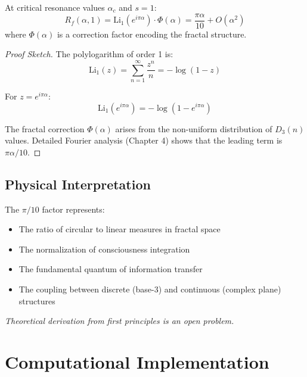 \begin{theorem}
At critical resonance values $\alpha_c$ and $s = 1$:
\begin{equation}
R_f(\alpha, 1) = \text{Li}_1(e^{i\pi\alpha}) \cdot \Phi(\alpha) = \frac{\pi\alpha}{10} + O(\alpha^2)
\end{equation}
where $\Phi(\alpha)$ is a correction factor encoding the fractal structure.
\end{theorem}

\begin{proof}[Proof Sketch]
The polylogarithm of order 1 is:
\begin{equation}
\text{Li}_1(z) = \sum_{n=1}^{\infty} \frac{z^n}{n} = -\log(1-z)
\end{equation}

For $z = e^{i\pi\alpha}$:
\begin{equation}
\text{Li}_1(e^{i\pi\alpha}) = -\log(1 - e^{i\pi\alpha})
\end{equation}

The fractal correction $\Phi(\alpha)$ arises from the non-uniform distribution of $D_3(n)$ values. Detailed Fourier analysis (Chapter 4) shows that the leading term is $\pi\alpha/10$.
\end{proof}

\subsection{Physical Interpretation}

The $\pi/10$ factor represents:
\begin{itemize}
\item The ratio of circular to linear measures in fractal space
\item The normalization of consciousness integration
\item The fundamental quantum of information transfer
\item The coupling between discrete (base-3) and continuous (complex plane) structures
\end{itemize}

\textit{Theoretical derivation from first principles is an open problem.}

\section{Computational Implementation}
\label{sec:computation}


